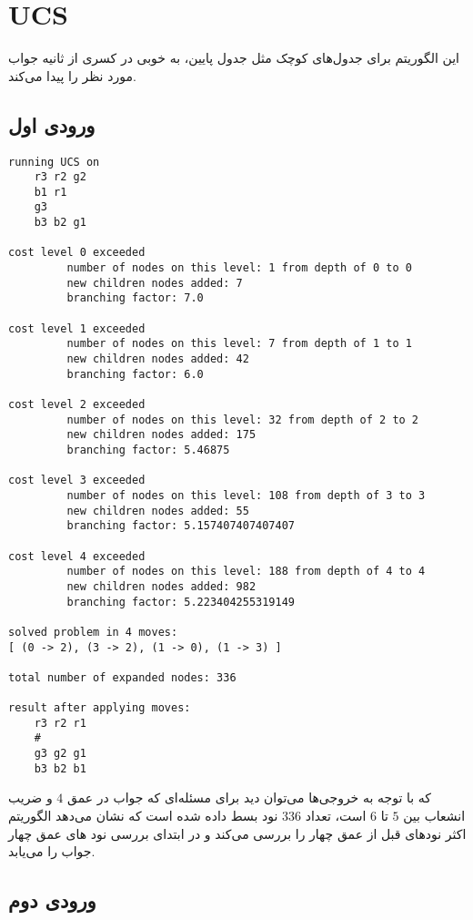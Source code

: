 \documentclass{article}
\begin{document}
\section*{UCS}
این الگوریتم برای جدول‌های کوچک مثل جدول پایین، به خوبی در کسری از ثانیه جواب مورد نظر را پیدا می‌کند.

\subsection*{ورودی اول}

\begin{latin}
\begin{lstlisting}
running UCS on 
	r3 r2 g2 
	b1 r1 
	g3
	b3 b2 g1

cost level 0 exceeded
         number of nodes on this level: 1 from depth of 0 to 0 
         new children nodes added: 7
         branching factor: 7.0

cost level 1 exceeded
         number of nodes on this level: 7 from depth of 1 to 1 
         new children nodes added: 42
         branching factor: 6.0

cost level 2 exceeded
         number of nodes on this level: 32 from depth of 2 to 2
         new children nodes added: 175
         branching factor: 5.46875

cost level 3 exceeded
         number of nodes on this level: 108 from depth of 3 to 3
         new children nodes added: 55
         branching factor: 5.157407407407407

cost level 4 exceeded
         number of nodes on this level: 188 from depth of 4 to 4
         new children nodes added: 982
         branching factor: 5.223404255319149

solved problem in 4 moves:
[ (0 -> 2), (3 -> 2), (1 -> 0), (1 -> 3) ]

total number of expanded nodes: 336

result after applying moves:
	r3 r2 r1
	#
	g3 g2 g1
	b3 b2 b1
\end{lstlisting}
\end{latin}

که با توجه به خروجی‌ها می‌توان دید برای مسئله‌ای که جواب در عمق $4$ و ضریب انشعاب بین $5$ تا $6$ است، تعداد 
$336$
نود بسط داده شده است که نشان می‌دهد الگوریتم اکثر نود‌های قبل از عمق چهار را بررسی می‌کند و در ابتدای بررسی نود های عمق چهار جواب را می‌یابد.


\newpage
\subsection*{ورودی دوم}
\end{document}
